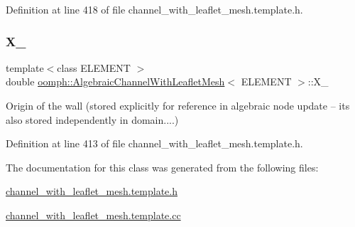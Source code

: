 Definition at line 418 of file channel\+\_\+with\+\_\+leaflet\+\_\+mesh.\+template.\+h.

\mbox{\label{classoomph_1_1AlgebraicChannelWithLeafletMesh_a1577beb584df4ad0f8517563934855fc}} 
\subsubsection{\texorpdfstring{X\+\_}{X\_0}}
{\footnotesize\ttfamily template$<$class E\+L\+E\+M\+E\+NT $>$ \\
double \hyperlink{classoomph_1_1AlgebraicChannelWithLeafletMesh}{oomph\+::\+Algebraic\+Channel\+With\+Leaflet\+Mesh}$<$ E\+L\+E\+M\+E\+NT $>$\+::X\+\_\hspace{0.3cm}{\ttfamily [protected]}}

Origin of the wall (stored explicitly for reference in algebraic node update -- it\textquotesingle{}s also stored independently in domain....) 

Definition at line 413 of file channel\+\_\+with\+\_\+leaflet\+\_\+mesh.\+template.\+h.



The documentation for this class was generated from the following files\+:\begin{DoxyCompactItemize}
\item 
\hyperlink{channel__with__leaflet__mesh_8template_8h}{channel\+\_\+with\+\_\+leaflet\+\_\+mesh.\+template.\+h}\item 
\hyperlink{channel__with__leaflet__mesh_8template_8cc}{channel\+\_\+with\+\_\+leaflet\+\_\+mesh.\+template.\+cc}\end{DoxyCompactItemize}
